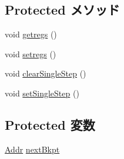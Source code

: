 \subsection*{Protected メソッド}
\begin{DoxyCompactItemize}
\item 
void \hyperlink{classSparcISA_1_1RemoteGDB_a62bc8adc5a48f1cbb5eb9bb64301d38d}{getregs} ()
\item 
void \hyperlink{classSparcISA_1_1RemoteGDB_a2051121b6bc93c8ca3856bbeeca7bdc1}{setregs} ()
\item 
void \hyperlink{classSparcISA_1_1RemoteGDB_afd89268069d9026378b06b08c97f65f8}{clearSingleStep} ()
\item 
void \hyperlink{classSparcISA_1_1RemoteGDB_a40d5da340fdb741de8cd3ffbc69708fe}{setSingleStep} ()
\end{DoxyCompactItemize}
\subsection*{Protected 変数}
\begin{DoxyCompactItemize}
\item 
\hyperlink{base_2types_8hh_af1bb03d6a4ee096394a6749f0a169232}{Addr} \hyperlink{classSparcISA_1_1RemoteGDB_a48116c182f6c43f3f31861355f288231}{nextBkpt}
\end{DoxyCompactItemize}



